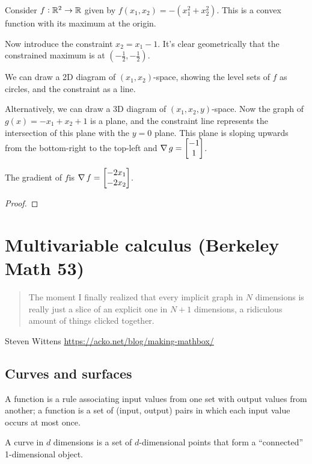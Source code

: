 \begin{intuition}
  Consider $f:\mathbb{R}^2 \to \mathbb{R}$ given by $f(x_1, x_2) = -(x_1^2 + x_2^2)$. This is a convex function with its maximum at the origin.

  Now introduce the constraint $x_2 = x_1 - 1$. It's clear geometrically that the constrained maximum
  is at $(-\frac{1}{2}, -\frac{1}{2}).$

  We can draw a 2D diagram of $(x_1, x_2)$-space, showing the level sets of $f$ as circles, and the constraint as a line.

  Alternatively, we can draw a 3D diagram of $(x_1, x_2, y)$-space. Now the graph of
  $g(x) = -x_1 + x_2 + 1$ is a plane, and the constraint line represents the intersection of this
  plane with the $y=0$ plane. This plane is sloping upwards from the bottom-right to the top-left and
  $\operatorname{\nabla} g = \begin{bmatrix}-1\\1\end{bmatrix}$.

  The gradient of $f$is $\operatorname{\nabla} f = \begin{bmatrix}-2x_1\\-2x_2\end{bmatrix}$.


\end{intuition}

\begin{proof}

\end{proof}


\newpage
\section{Multivariable calculus (Berkeley Math 53)}

\begin{quote}
  The moment I finally realized that every implicit graph in $N$ dimensions is really just a slice of
  an explicit one in $N+1$ dimensions, a ridiculous amount of things clicked together.
\end{quote}
Steven Wittens \url{https://acko.net/blog/making-mathbox/}

\subsection{Curves and surfaces}

A function is a rule associating input values from one set with output values
from another; a function is a set of (input, output) pairs in which each input
value occurs at most once.

A curve in $d$ dimensions is a set of $d$-dimensional points that form a
``connected'' 1-dimensional object.

